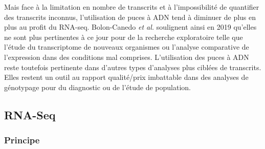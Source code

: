 Mais face à la limitation en nombre de transcrits et à l'impossibilité de quantifier des transcrits inconnus, l'utilisation de puces à ADN tend à diminuer de plus en plus au profit du RNA-seq. Bolon-Canedo \textit{et al.} soulignent ainsi en 2019 \cite{Bolon-Canedo2019} qu'elles ne sont plus pertinentes à ce jour pour de la recherche exploratoire telle que l'étude du transcriptome de nouveaux organismes ou l'analyse comparative de l'expression dans des conditions mal comprises.
L'utilisation des puces à ADN reste toutefois pertinente dans d'autres types d'analyses plus ciblées de transcrits. Elles restent un outil au rapport qualité/prix imbattable dans des analyses de génotypage pour du diagnostic ou de l'étude de population.






\subsection{RNA-Seq}

\subsubsection{Principe}

